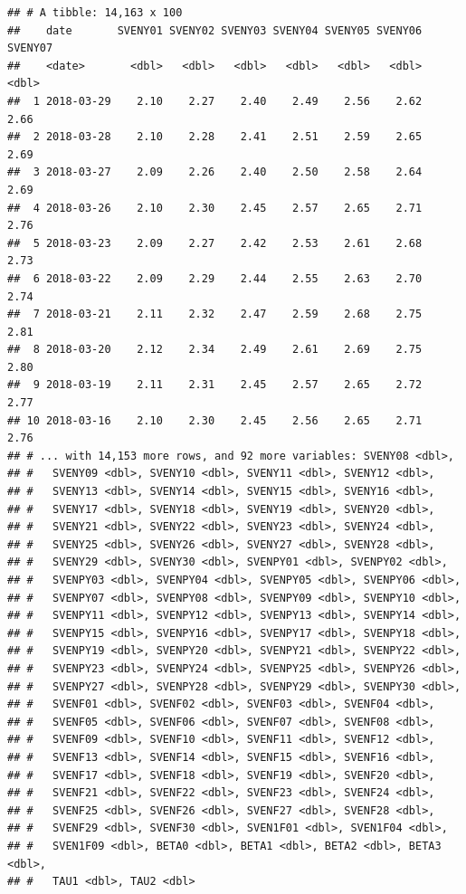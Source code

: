\documentclass[]{book}
\theoremstyle{definition}
\theoremstyle{definition}
\theoremstyle{definition}
\theoremstyle{remark}
\begin{document}
\begin{verbatim}
## # A tibble: 14,163 x 100
##    date       SVENY01 SVENY02 SVENY03 SVENY04 SVENY05 SVENY06 SVENY07
##    <date>       <dbl>   <dbl>   <dbl>   <dbl>   <dbl>   <dbl>   <dbl>
##  1 2018-03-29    2.10    2.27    2.40    2.49    2.56    2.62    2.66
##  2 2018-03-28    2.10    2.28    2.41    2.51    2.59    2.65    2.69
##  3 2018-03-27    2.09    2.26    2.40    2.50    2.58    2.64    2.69
##  4 2018-03-26    2.10    2.30    2.45    2.57    2.65    2.71    2.76
##  5 2018-03-23    2.09    2.27    2.42    2.53    2.61    2.68    2.73
##  6 2018-03-22    2.09    2.29    2.44    2.55    2.63    2.70    2.74
##  7 2018-03-21    2.11    2.32    2.47    2.59    2.68    2.75    2.81
##  8 2018-03-20    2.12    2.34    2.49    2.61    2.69    2.75    2.80
##  9 2018-03-19    2.11    2.31    2.45    2.57    2.65    2.72    2.77
## 10 2018-03-16    2.10    2.30    2.45    2.56    2.65    2.71    2.76
## # ... with 14,153 more rows, and 92 more variables: SVENY08 <dbl>,
## #   SVENY09 <dbl>, SVENY10 <dbl>, SVENY11 <dbl>, SVENY12 <dbl>,
## #   SVENY13 <dbl>, SVENY14 <dbl>, SVENY15 <dbl>, SVENY16 <dbl>,
## #   SVENY17 <dbl>, SVENY18 <dbl>, SVENY19 <dbl>, SVENY20 <dbl>,
## #   SVENY21 <dbl>, SVENY22 <dbl>, SVENY23 <dbl>, SVENY24 <dbl>,
## #   SVENY25 <dbl>, SVENY26 <dbl>, SVENY27 <dbl>, SVENY28 <dbl>,
## #   SVENY29 <dbl>, SVENY30 <dbl>, SVENPY01 <dbl>, SVENPY02 <dbl>,
## #   SVENPY03 <dbl>, SVENPY04 <dbl>, SVENPY05 <dbl>, SVENPY06 <dbl>,
## #   SVENPY07 <dbl>, SVENPY08 <dbl>, SVENPY09 <dbl>, SVENPY10 <dbl>,
## #   SVENPY11 <dbl>, SVENPY12 <dbl>, SVENPY13 <dbl>, SVENPY14 <dbl>,
## #   SVENPY15 <dbl>, SVENPY16 <dbl>, SVENPY17 <dbl>, SVENPY18 <dbl>,
## #   SVENPY19 <dbl>, SVENPY20 <dbl>, SVENPY21 <dbl>, SVENPY22 <dbl>,
## #   SVENPY23 <dbl>, SVENPY24 <dbl>, SVENPY25 <dbl>, SVENPY26 <dbl>,
## #   SVENPY27 <dbl>, SVENPY28 <dbl>, SVENPY29 <dbl>, SVENPY30 <dbl>,
## #   SVENF01 <dbl>, SVENF02 <dbl>, SVENF03 <dbl>, SVENF04 <dbl>,
## #   SVENF05 <dbl>, SVENF06 <dbl>, SVENF07 <dbl>, SVENF08 <dbl>,
## #   SVENF09 <dbl>, SVENF10 <dbl>, SVENF11 <dbl>, SVENF12 <dbl>,
## #   SVENF13 <dbl>, SVENF14 <dbl>, SVENF15 <dbl>, SVENF16 <dbl>,
## #   SVENF17 <dbl>, SVENF18 <dbl>, SVENF19 <dbl>, SVENF20 <dbl>,
## #   SVENF21 <dbl>, SVENF22 <dbl>, SVENF23 <dbl>, SVENF24 <dbl>,
## #   SVENF25 <dbl>, SVENF26 <dbl>, SVENF27 <dbl>, SVENF28 <dbl>,
## #   SVENF29 <dbl>, SVENF30 <dbl>, SVEN1F01 <dbl>, SVEN1F04 <dbl>,
## #   SVEN1F09 <dbl>, BETA0 <dbl>, BETA1 <dbl>, BETA2 <dbl>, BETA3 <dbl>,
## #   TAU1 <dbl>, TAU2 <dbl>
\end{verbatim}
\end{document}
